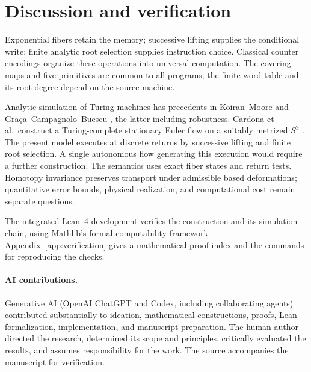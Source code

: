 \documentclass[11pt]{article}
\theoremstyle{definition}
\theoremstyle{plain}
\begin{document}
\section{Discussion and verification}

Exponential fibers retain the memory; successive lifting supplies
the conditional write; finite analytic root selection supplies
instruction choice. Classical counter encodings organize these
operations into universal computation. The covering maps and five
primitives are common to all programs; the finite word table and
its root degree depend on the source machine.

Analytic simulation of Turing machines has precedents in Koiran--Moore
\cite{koiran} and Gra\c{c}a--Campagnolo--Buescu \cite{graca}, the
latter including robustness. Cardona et al.\ construct a Turing-complete
stationary Euler flow on a suitably metrized $S^3$ \cite{cardona}.
The present model executes at discrete returns by successive lifting
and finite root selection. A single autonomous flow generating this
execution would require a further construction. The semantics uses
exact fiber states and return tests. Homotopy invariance preserves
transport under admissible based deformations; quantitative error
bounds, physical realization, and computational cost remain separate
questions.

The integrated Lean~4 development verifies the construction and its
simulation chain, using Mathlib's formal computability framework
\cite{carneiro}. Appendix~\ref{app:verification} gives a mathematical
proof index and the commands for reproducing the checks.

\paragraph{AI contributions.}
Generative AI (OpenAI ChatGPT and Codex, including collaborating agents)
contributed substantially to ideation, mathematical constructions,
proofs, Lean formalization, implementation, and manuscript preparation.
The human author directed the research, determined its scope and
principles, critically evaluated the results, and assumes responsibility
for the work. The source accompanies the manuscript for verification.
\end{document}

